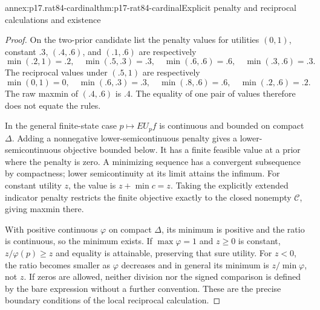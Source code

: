 \begin{annexitem}{annex:p17.rat84-cardinal}{thm:p17-rat84-cardinal}{Explicit penalty and reciprocal calculations and existence}
\begin{proof}
On the two-prior candidate list the penalty values for
utilities \((0,1)\), constant \(.3\), \((.4,.6)\), and
\((.1,.6)\) are respectively
\[
 \min(.2,1)=.2,\quad\min(.5,.3)=.3,\quad
 \min(.6,.6)=.6,\quad\min(.3,.6)=.3.
\]
The reciprocal values under \((.5,1)\) are respectively
\[
 \min(0,1)=0,\quad\min(.6,.3)=.3,\quad
 \min(.8,.6)=.6,\quad\min(.2,.6)=.2.
\]
The raw maxmin of \((.4,.6)\) is \(.4\). The equality of
one pair of values therefore does not equate the rules.

In the general finite-state case \(p\mapsto EU_p f\)
is continuous and bounded on compact \(\Delta\). Adding
a nonnegative lower-semicontinuous penalty gives a
lower-semicontinuous objective bounded below. It has a
finite feasible value at a prior where the penalty is zero.
A minimizing sequence has a convergent subsequence by
compactness; lower semicontinuity at its limit attains
the infimum. For constant utility \(z\), the value is
\(z+\min c=z\). Taking the explicitly extended indicator
penalty restricts the finite objective exactly to the closed
nonempty \(\mathcal C\), giving maxmin there.

With positive continuous \(\varphi\) on compact
\(\Delta\), its minimum is positive and the ratio is
continuous, so the minimum exists. If \(\max\varphi=1\)
and \(z\geq0\) is constant, \(z/\varphi(p)\geq z\)
and equality is attainable, preserving that sure utility.
For \(z<0\), the ratio becomes smaller as
\(\varphi\) decreases and in general its minimum is
\(z/\min\varphi\), not \(z\). If zeros are allowed,
neither division nor the signed comparison is defined
by the bare expression without a further convention.
These are the precise boundary conditions of the local
reciprocal calculation.
\end{proof}
\end{annexitem}

